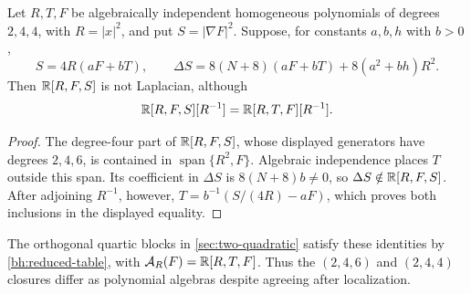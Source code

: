 \begin{proposition}
\label{prop:quartic-composition-not-rfs}
Let \(R,T,F\) be algebraically independent homogeneous polynomials
of degrees \(2,4,4\), with \(R=|x|^2\), and put
\(S=|\nabla F|^2\). Suppose, for constants \(a,b,h\) with \(b>0\),
\[
 S=4R(aF+bT),\qquad
 \Delta S=8(N+8)(aF+bT)+8(a^2+bh)R^2.
\]
Then \(\mathbb R[R,F,S]\) is not Laplacian, although
\[
 \mathbb R[R,F,S][R^{-1}]=\mathbb R[R,T,F][R^{-1}].
\]
\end{proposition}

\begin{proof}
The degree-four part of \(\mathbb R[R,F,S]\), whose displayed generators
have degrees \(2,4,6\), is contained in
\(\operatorname{span}\{R^2,F\}\). Algebraic independence places
\(T\) outside this span. Its coefficient in \(\Delta S\) is
\(8(N+8)b\ne0\), so \(\Delta S\notin\mathbb R[R,F,S]\).
After adjoining \(R^{-1}\), however,
\(T=b^{-1}(S/(4R)-aF)\), which proves both inclusions in the
displayed equality.
\end{proof}

The orthogonal quartic blocks in \cref{sec:two-quadratic} satisfy
these identities by \eqref{bh:reduced-table}, with
\(\mathcal A_R(F)=\mathbb R[R,T,F]\). Thus the \((2,4,6)\) and \((2,4,4)\)
closures differ as polynomial algebras despite agreeing after localization.
